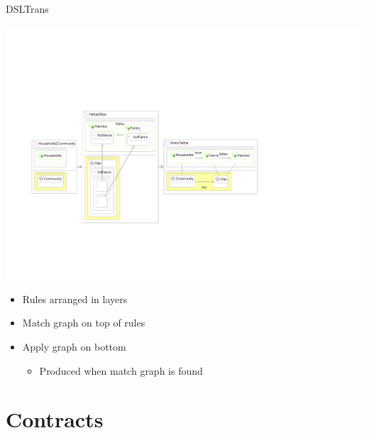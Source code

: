 \documentclass[12pt, handout]{beamer}
\begin{document}
\begin{frame}{DSLTrans}
\begin{center}
\includegraphics[width=\textwidth]{figures/Rules}
\end{center}
\pause
\begin{itemize}[<+->]
\item Rules arranged in layers
\item Match graph on top of rules
\item Apply graph on bottom
\begin{itemize}
\item Produced when match graph is found
\end{itemize}
\end{itemize}
\end{frame}

\section{Contracts}
\end{document}
